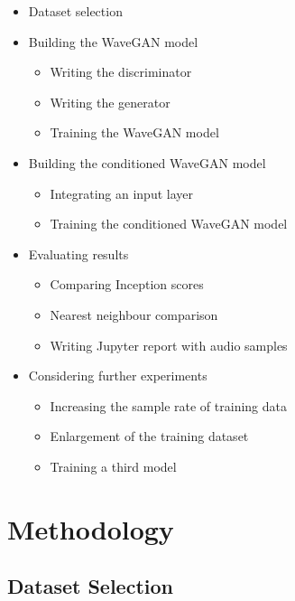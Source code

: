 \documentclass[a4paper, dvipsnames, titlepage]{article}
\begin{document}
\begin{itemize}
\item Dataset selection
\item Building the WaveGAN model
  \begin{itemize}
  \item Writing the discriminator
  \item Writing the generator
  \item Training the WaveGAN model
  \end{itemize}
\item Building the conditioned WaveGAN model
  \begin{itemize}
  \item Integrating an input layer
  \item Training the conditioned WaveGAN model
  \end{itemize}
\item Evaluating results
  \begin{itemize}
  \item Comparing Inception scores
  \item Nearest neighbour comparison
  \item Writing Jupyter report with audio samples
  \end{itemize}
\item Considering further experiments
  \begin{itemize}
  \item Increasing the sample rate of training data
  \item Enlargement of the training dataset
  \item Training a third model
  \end{itemize}
\end{itemize}

\newpage

\section{Methodology}

\subsection{Dataset Selection}
\end{document}

